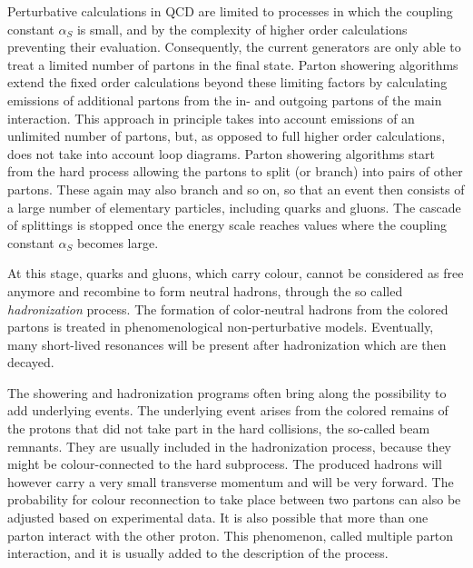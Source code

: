Perturbative calculations in QCD are limited to processes in which the coupling constant $\alpha_S$ is small, and by the complexity of higher order calculations preventing their evaluation.
Consequently, the current generators are only able to treat a limited number of partons in the final state. 
Parton showering algorithms extend the fixed order calculations beyond these limiting factors by calculating emissions of additional partons from the in- and outgoing partons of the main interaction.
This approach in principle takes into account emissions of an unlimited number of partons, but, as opposed to full higher order calculations, does not take into account loop diagrams.
Parton showering algorithms start from the hard process allowing the partons to split (or branch) into pairs of other partons.
These again may also branch and so on, so that an event then consists of a large number of elementary particles, including quarks and gluons.
The cascade of splittings is stopped once the energy scale reaches values where the coupling constant $\alpha_S$ becomes large.

At this stage, quarks and gluons, which carry colour, cannot be considered as free anymore and recombine to form neutral hadrons, through the so called \textit{hadronization} process.
The formation of color-neutral hadrons from the colored partons is treated in phenomenological non-perturbative models.
Eventually, many short-lived resonances will be present after hadronization which are then decayed.

The showering and hadronization programs often bring along the possibility to add underlying events. The underlying event arises from the colored remains of the protons that did not take part in the hard collisions, the so-called beam remnants.
They are usually included in the hadronization process, because they might be colour-connected to the hard subprocess. The produced hadrons will however carry a very small transverse momentum and will be very forward.
The probability for colour reconnection to take place between two partons can also be adjusted based on experimental data. %
It is also possible that more than one parton interact with the other proton. This phenomenon, called multiple parton interaction, and it is usually added to the description of the process.\\

